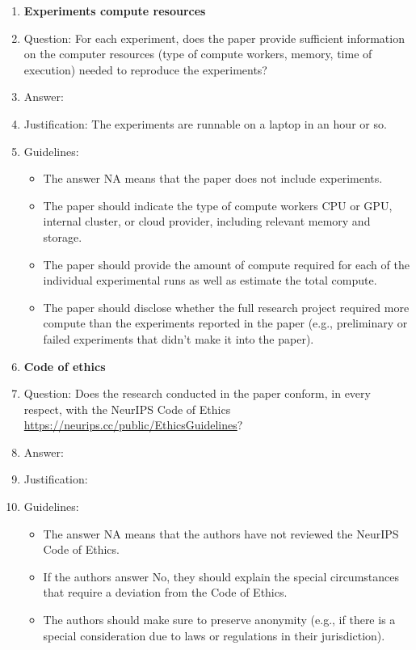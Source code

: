 \documentclass{article}
\begin{document}
\begin{enumerate}
\item {\bf Experiments compute resources}
    \item[] Question: For each experiment, does the paper provide sufficient information on the computer resources (type of compute workers, memory, time of execution) needed to reproduce the experiments?
    \item[] Answer: \answerYes{} %
    \item[] Justification: The experiments are runnable on a laptop in an
      hour or so.
    \item[] Guidelines:
    \begin{itemize}
        \item The answer NA means that the paper does not include experiments.
        \item The paper should indicate the type of compute workers CPU or GPU, internal cluster, or cloud provider, including relevant memory and storage.
        \item The paper should provide the amount of compute required for each of the individual experimental runs as well as estimate the total compute. 
        \item The paper should disclose whether the full research project required more compute than the experiments reported in the paper (e.g., preliminary or failed experiments that didn't make it into the paper). 
    \end{itemize}
    
\item {\bf Code of ethics}
    \item[] Question: Does the research conducted in the paper conform, in every respect, with the NeurIPS Code of Ethics \url{https://neurips.cc/public/EthicsGuidelines}?
    \item[] Answer: \answerYes{} %
    \item[] Justification:
    \item[] Guidelines:
    \begin{itemize}
        \item The answer NA means that the authors have not reviewed the NeurIPS Code of Ethics.
        \item If the authors answer No, they should explain the special circumstances that require a deviation from the Code of Ethics.
        \item The authors should make sure to preserve anonymity (e.g., if there is a special consideration due to laws or regulations in their jurisdiction).
    \end{itemize}



\end{enumerate}
\end{document}
